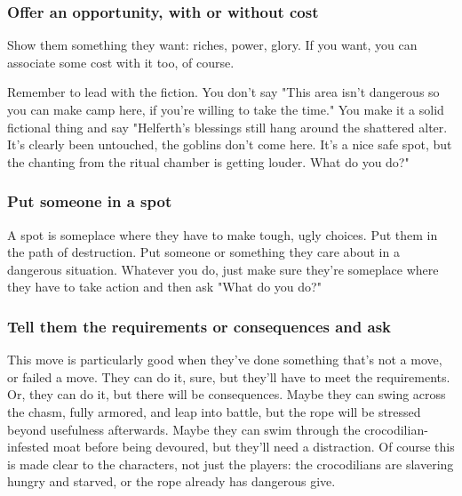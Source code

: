        
\subsubsection{Offer an opportunity, with or without cost}     
       

Show them something they want: riches, power, glory. If you want, you can associate some cost with it too, of course.

       

Remember to lead with the fiction. You don't say "This area isn't dangerous so you can make camp here, if you're willing to take the time." You make it a solid fictional thing and say "Helferth's blessings still hang around the shattered alter. It's clearly been untouched, the goblins don't come here. It's a nice safe spot, but the chanting from the ritual chamber is getting louder. What do you do?"

       
\subsubsection{Put someone in a spot}    
       

A spot is someplace where they have to make tough, ugly choices. Put them in the path of destruction. Put someone or something they care about in a dangerous situation. Whatever you do, just make sure they're someplace where they have to take action and then ask "What do you do?"

       
\subsubsection{Tell them the requirements or consequences and ask}    
       

This move is particularly good when they've done something that's not a move, or failed a move. They can do it, sure, but they'll have to meet the requirements. Or, they can do it, but there will be consequences. Maybe they can swing across the chasm, fully armored, and leap into battle, but the rope will be stressed beyond usefulness afterwards. Maybe they can swim through the crocodilian-infested moat before being devoured, but they'll need a distraction. Of course this is made clear to the characters, not just the players: the crocodilians are slavering hungry and starved, or the rope already has dangerous give.

